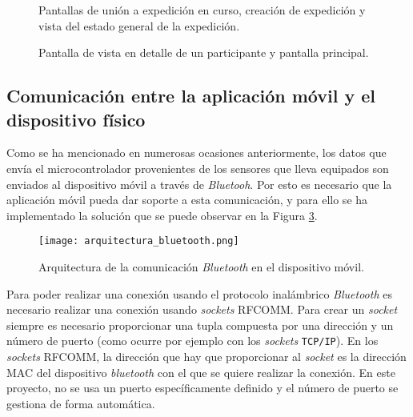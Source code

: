 \begin{itemize}
\begin{figure}
 \centering
  
  \caption{Pantallas de unión a expedición en curso, creación de expedición y vista del estado general de la expedición.}
  \label{fig:fig2}
\end{figure}

\begin{figure}
 \centering
  \caption{Pantalla de vista en detalle de un participante y pantalla principal.}
  \label{fig:fig3}
\end{figure}

\end{itemize}

\subsection{Comunicación entre la aplicación móvil y el dispositivo físico}

Como se ha mencionado en numerosas ocasiones anteriormente, los datos que envía el microcontrolador provenientes de los sensores que lleva equipados son enviados al dispositivo móvil a través de \textit{Bluetooh}. Por esto es necesario que la aplicación móvil pueda dar soporte a esta comunicación, y para ello se ha implementado la solución que se puede observar en la Figura \ref{fig:arqu_blue}.

\begin{figure}[!h]
\begin{center}
\texttt{[image: arquitectura\_bluetooth.png]}
\caption{Arquitectura de la comunicación \textit{Bluetooth} en el dispositivo móvil.}
\label{fig:arqu_blue}
\end{center}
\end{figure}

Para poder realizar una conexión usando el protocolo inalámbrico \textit{Bluetooth} es necesario realizar una conexión usando \textit{sockets} \ac{RFCOMM}. Para crear un \textit{socket} siempre es necesario proporcionar una tupla compuesta por una dirección y un número de puerto (como ocurre por ejemplo con los \textit{sockets} \texttt{TCP/IP}). En los \textit{sockets} \ac{RFCOMM}, la dirección que hay que proporcionar al \textit{socket} es la dirección \ac{MAC} del dispositivo \textit{bluetooth} con el que se quiere realizar la conexión. En este proyecto, no se usa un puerto específicamente definido y el número de puerto se gestiona de forma automática. 

